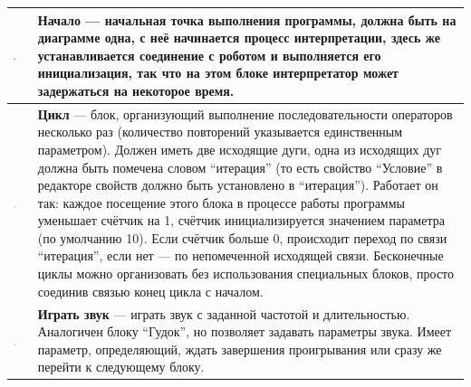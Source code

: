 \documentclass[a4paper,12pt,twoside]{article}
\begin{document}
\begin{center}
	\begin{tabular}{m{} | m{}}
    {\vspace{10pt}\includegraphics[width=0.15\textwidth]{Begin.png}}         & \textbf{Начало} --- начальная точка выполнения программы, должна быть на диаграмме одна, с неё начинается процесс интерпретации, здесь же устанавливается соединение с роботом и выполняется его инициализация, так что на этом блоке интерпретатор может задержаться на некоторое время. \\ \hline
    {\vspace{10pt}\includegraphics[width=0.15\textwidth]{Loop.png}}          & \textbf{Цикл} --- блок, организующий выполнение последовательности операторов несколько раз (количество повторений указывается единственным параметром). Должен иметь две исходящие дуги, одна из исходящих дуг должна быть помечена словом "`итерация"' (то есть свойство "`Условие"' в редакторе свойств должно быть установлено в "`итерация"'). Работает он так: каждое посещение этого блока в процессе работы программы уменьшает счётчик на 1, счётчик инициализируется значением параметра (по умолчанию 10). Если счётчик больше 0, происходит переход по связи "`итерация"', если нет --- по непомеченной исходящей связи. Бесконечные циклы можно организовать без использования специальных блоков, просто соединив связью конец цикла с началом. \\ \hline
    {\vspace{10pt}\includegraphics[width=0.15\textwidth]{PlayTone.png}}      & \textbf{Играть звук} --- играть звук с заданной частотой и длительностью. Аналогичен блоку "`Гудок"', но позволяет задавать параметры звука. Имеет параметр, определяющий, ждать завершения проигрывания или сразу же перейти к следующему блоку. \\ \hline

\end{tabular}
\end{center}
\end{document}
